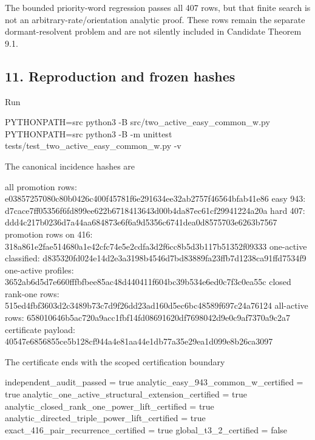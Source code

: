 The bounded priority-word regression passes all 407 rows, but that
finite search is not an arbitrary-rate/orientation analytic proof. These
rows remain the separate dormant-resolvent problem and are not silently
included in Candidate Theorem 9.1.

\subsection{11. Reproduction and frozen
hashes}

Run

\begin{CodeBlock}
PYTHONPATH=src python3 -B src/two_active_easy_common_w.py
PYTHONPATH=src python3 -B -m unittest tests/test_two_active_easy_common_w.py -v
\end{CodeBlock}

The canonical incidence hashes are

\begin{CodeBlock}
all promotion rows:       e03857257080c80b0426c400f45781f6e291634ee32ab2757f46564bfab41e86
easy 943:                 d7cace7ff05356f6fd899ee622b6718413643d00b4da87ec61cf29941224a20a
hard 407:                 ddd4c217b0236d7a44aa684873e6f6a9d5356c6741dea0d8575703e6263b7567
promotion rows on 416:    318a861e2fae514680a1e42cfc74e5e2cdfa3d2f6cc8b5d3b117b51352f09333
one-active classified:    d835320fd024e14d2e3a3198b4546d7bd83889fa23ffb7d1238ca91ffd7534f9
one-active profiles:      3652ab6d5d7e660fffbfbee85ac48d440411f604bc39b534e6ed0c7f3c0ea55c
closed rank-one rows:     515ed4fbf3603d2c3489b73c7d9f26dd23ad160d5ec6bc48589f697c24a76124
all-active rows:          658010646b5ac720a9acc1fbf14fd08691620df7698042d9e0c9af7370a9c2a7
certificate payload:      40547e6856855ce5b128cf944a4e81aa44e1db77a35e29ea1d099e8b26ca3097
\end{CodeBlock}

The certificate ends with the scoped certification boundary

\begin{CodeBlock}
independent_audit_passed = true
analytic_easy_943_common_w_certified = true
analytic_one_active_structural_extension_certified = true
analytic_closed_rank_one_power_lift_certified = true
analytic_directed_triple_power_lift_certified = true
exact_416_pair_recurrence_certified = true
global_t3_2_certified = false
\end{CodeBlock}
